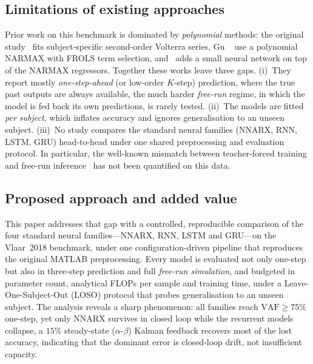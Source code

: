 \documentclass[10pt,twocolumn,letterpaper]{article}
\begin{document}
\subsection{Limitations of existing approaches}
Prior work on this benchmark is dominated by \emph{polynomial} methods:
the original study~\cite{Vlaar2018} fits subject-specific second-order
Volterra series, Gu \etal~\cite{Gu2021} use a polynomial NARMAX with
FROLS term selection, and~\cite{Gu2018} adds a small neural network on
top of the NARMAX regressors. Together these works leave three gaps.
(i)~They report mostly \emph{one-step-ahead} (or low-order $K$-step)
prediction, where the true past outputs are always available, the much
harder \emph{free-run} regime, in which the model is fed back its own
predictions, is rarely tested. (ii)~The models are fitted
\emph{per subject}, which inflates accuracy and ignores generalisation to
an unseen subject. (iii)~No study compares the standard neural families
(NNARX, RNN, LSTM, GRU) head-to-head under one shared preprocessing and
evaluation protocol. In particular, the well-known mismatch between
teacher-forced training and free-run inference~\cite{CourseMaterial} has not
been quantified on this data.

\subsection{Proposed approach and added value}
This paper addresses that gap with a controlled, reproducible comparison
of the four standard neural families---NNARX, RNN, LSTM and GRU---on the
Vlaar~2018 benchmark, under one configuration-driven pipeline that
reproduces the original MATLAB preprocessing. Every model is evaluated not
only one-step but also in three-step prediction and full \emph{free-run
simulation}, and budgeted in parameter count, analytical FLOPs per sample
and training time, under a Leave-One-Subject-Out (LOSO) protocol that
probes generalisation to an unseen subject. The analysis reveals a sharp
phenomenon: all families reach $\mathrm{VAF}\geq 75\%$ one-step, yet only
NNARX survives in closed loop while the recurrent models collapse, a
$15\%$ steady-state ($\alpha$-$\beta$) Kalman feedback recovers most of the
lost accuracy, indicating that the dominant error is closed-loop drift,
not insufficient capacity.
\end{document}
